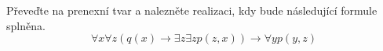 \subsubsection{}
Převeďte na prenexní tvar a nalezněte realizaci, kdy bude následující formule
splněna.
$$\forall x \forall z (q(x) \rightarrow \exists z \exists z p(z,x)) \rightarrow
\forall y p(y,z)$$
